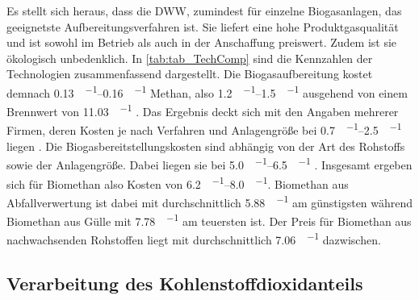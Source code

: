 Es stellt sich heraus, dass die \gls{DWW}, zumindest für einzelne Biogasanlagen, das geeignetste Aufbereitungsverfahren ist. Sie liefert eine hohe Produktgasqualität und ist sowohl im Betrieb als auch in der Anschaffung preiswert. Zudem ist sie ökologisch unbedenklich. In \ref{tab:tab_TechComp} sind die Kennzahlen der Technologien zusammenfassend dargestellt. Die Biogasaufbereitung kostet demnach \SIrange{0,13}{0,16}{\sieuro\per\normvol} Methan, also \SIrange{1,2}{1,5}{\ct\per\kwh} ausgehend von einem Brennwert von \SI{11,03}{\kwh\per\normvol} \parencite{meier14}. Das Ergebnis deckt sich mit den Angaben mehrerer Firmen, deren Kosten je nach Verfahren und Anlagengröße bei \SIrange{0,7}{2,5}{\ct\per\kwh} liegen \parencite{FNR14}. Die Biogasbereitstellungskosten sind abhängig von der Art des Rohstoffs sowie der Anlagengröße. Dabei liegen sie bei \SIrange{5,0}{6,5}{\ct\per\kwh} \parencite{FNR14}. Insgesamt ergeben sich für Biomethan also Kosten von \SIrange{6,2}{8,0}{\ct\per\kwh}. Biomethan aus Abfallverwertung ist dabei mit durchschnittlich \SI{5,88}{\ct\per\kwh} am günstigsten während Biomethan aus Gülle mit \SI{7,78}{\ct\per\kwh} am teuersten ist. Der Preis für Biomethan aus nachwachsenden Rohstoffen liegt mit durchschnittlich \SI{7,06}{\ct\per\kwh} dazwischen\parencite{dena19}.

\begin{landscape}



\end{landscape}


\subsection{Verarbeitung des Kohlenstoffdioxidanteils}

